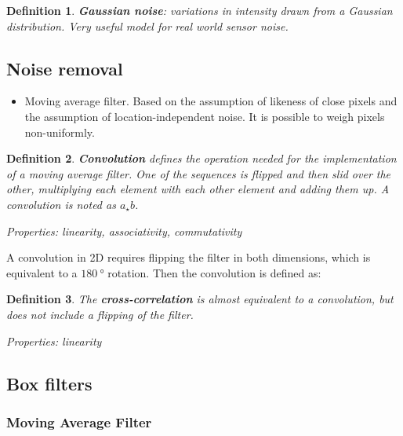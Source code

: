 \documentclass[10pt,a4paper]{scrartcl}
\newtheorem{define}{Definition}
\begin{document}
\begin{multicols*}{2}
\begin{define}
\textbf{Gaussian noise}: variations in intensity drawn from a Gaussian distribution. Very useful model for real world sensor noise.
\end{define}

\subsection{Noise removal}

\begin{itemize}
\item Moving average filter. Based on the assumption of likeness of close pixels and the assumption of location-independent noise. It is possible to weigh pixels non-uniformly.
\end{itemize}


\begin{define}
\textbf{Convolution} defines the operation needed for the implementation of a moving average filter. One of the sequences is flipped and then slid over the other, multiplying each element with each other element and adding them up. A convolution is noted as $a_\star b$.

Properties: linearity, associativity, commutativity
\end{define}

A convolution in 2D requires flipping the filter in both dimensions, which is equivalent to a $\SI{180}{\degree}$ rotation. Then the convolution is defined as:


\begin{define}
The \textbf{cross-correlation} is almost equivalent to a convolution, but does not include a flipping of the filter.

Properties: linearity
\end{define}


\subsection{Box filters}

\subsubsection{Moving Average Filter}


\end{multicols*}
\end{document}
